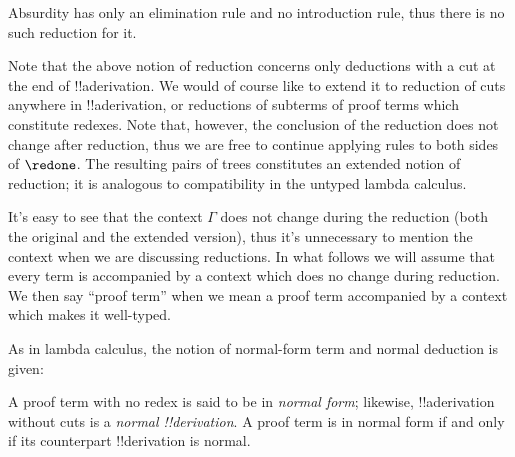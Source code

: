 \documentclass[../../../include/open-logic-section]{subfiles}
\begin{document}
Absurdity has only an elimination rule and no introduction rule, thus
there is no such reduction for it.

Note that the above notion of reduction concerns only deductions with
a cut at the end of !!a{derivation}. We would of course like to extend
it to reduction of cuts anywhere in !!a{derivation}, or reductions of
subterms of proof terms which constitute redexes. Note that, however,
the conclusion of the reduction does not change after reduction, thus
we are free to continue applying rules to both sides of $\redone$. The
resulting pairs of trees constitutes an extended notion of reduction;
it is analogous to compatibility in the untyped lambda calculus.

It's easy to see that the context $\Gamma$ does not change during the
reduction (both the original and the extended version), thus it's
unnecessary to mention the context when we are discussing
reductions. In what follows we will assume that every term is
accompanied by a context which does no change during reduction. We
then say ``proof term'' when we mean a proof term accompanied by a
context which makes it well-typed.

As in lambda calculus, the notion of normal-form term and normal
deduction is given:
\begin{defn}
  A proof term with no redex is said to be in \emph{normal form};
  likewise, !!a{derivation} without cuts is a \emph{normal
    !!{derivation}}. A proof term is in normal form if and
  only if its counterpart !!{derivation} is normal.
\end{defn}
\end{document}
